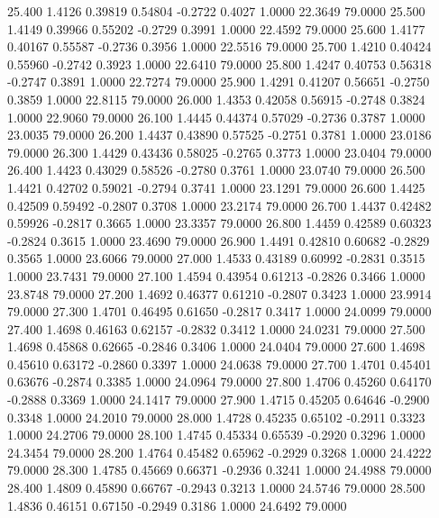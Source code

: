   25.400   1.4126   0.39819   0.54804  -0.2722   0.4027   1.0000  22.3649  79.0000
  25.500   1.4149   0.39966   0.55202  -0.2729   0.3991   1.0000  22.4592  79.0000
  25.600   1.4177   0.40167   0.55587  -0.2736   0.3956   1.0000  22.5516  79.0000
  25.700   1.4210   0.40424   0.55960  -0.2742   0.3923   1.0000  22.6410  79.0000
  25.800   1.4247   0.40753   0.56318  -0.2747   0.3891   1.0000  22.7274  79.0000
  25.900   1.4291   0.41207   0.56651  -0.2750   0.3859   1.0000  22.8115  79.0000
  26.000   1.4353   0.42058   0.56915  -0.2748   0.3824   1.0000  22.9060  79.0000
  26.100   1.4445   0.44374   0.57029  -0.2736   0.3787   1.0000  23.0035  79.0000
  26.200   1.4437   0.43890   0.57525  -0.2751   0.3781   1.0000  23.0186  79.0000
  26.300   1.4429   0.43436   0.58025  -0.2765   0.3773   1.0000  23.0404  79.0000
  26.400   1.4423   0.43029   0.58526  -0.2780   0.3761   1.0000  23.0740  79.0000
  26.500   1.4421   0.42702   0.59021  -0.2794   0.3741   1.0000  23.1291  79.0000
  26.600   1.4425   0.42509   0.59492  -0.2807   0.3708   1.0000  23.2174  79.0000
  26.700   1.4437   0.42482   0.59926  -0.2817   0.3665   1.0000  23.3357  79.0000
  26.800   1.4459   0.42589   0.60323  -0.2824   0.3615   1.0000  23.4690  79.0000
  26.900   1.4491   0.42810   0.60682  -0.2829   0.3565   1.0000  23.6066  79.0000
  27.000   1.4533   0.43189   0.60992  -0.2831   0.3515   1.0000  23.7431  79.0000
  27.100   1.4594   0.43954   0.61213  -0.2826   0.3466   1.0000  23.8748  79.0000
  27.200   1.4692   0.46377   0.61210  -0.2807   0.3423   1.0000  23.9914  79.0000
  27.300   1.4701   0.46495   0.61650  -0.2817   0.3417   1.0000  24.0099  79.0000
  27.400   1.4698   0.46163   0.62157  -0.2832   0.3412   1.0000  24.0231  79.0000
  27.500   1.4698   0.45868   0.62665  -0.2846   0.3406   1.0000  24.0404  79.0000
  27.600   1.4698   0.45610   0.63172  -0.2860   0.3397   1.0000  24.0638  79.0000
  27.700   1.4701   0.45401   0.63676  -0.2874   0.3385   1.0000  24.0964  79.0000
  27.800   1.4706   0.45260   0.64170  -0.2888   0.3369   1.0000  24.1417  79.0000
  27.900   1.4715   0.45205   0.64646  -0.2900   0.3348   1.0000  24.2010  79.0000
  28.000   1.4728   0.45235   0.65102  -0.2911   0.3323   1.0000  24.2706  79.0000
  28.100   1.4745   0.45334   0.65539  -0.2920   0.3296   1.0000  24.3454  79.0000
  28.200   1.4764   0.45482   0.65962  -0.2929   0.3268   1.0000  24.4222  79.0000
  28.300   1.4785   0.45669   0.66371  -0.2936   0.3241   1.0000  24.4988  79.0000
  28.400   1.4809   0.45890   0.66767  -0.2943   0.3213   1.0000  24.5746  79.0000
  28.500   1.4836   0.46151   0.67150  -0.2949   0.3186   1.0000  24.6492  79.0000
